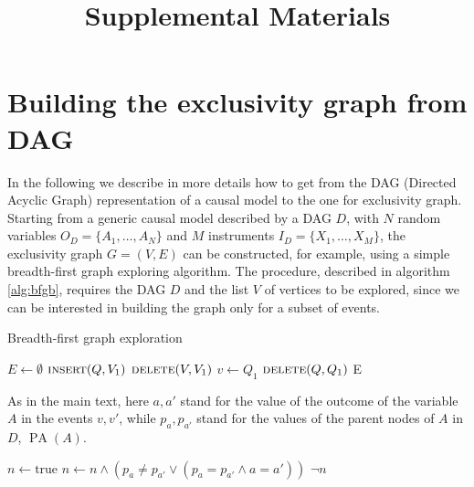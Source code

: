 \documentclass[letterpaper]{article}
\DeclareMathOperator*{\PA}{PA}
\begin{document}
\title{Supplemental Materials}
\maketitle
\section*{Building the exclusivity graph from DAG}
In the following we describe in more details how to get from the DAG
(Directed Acyclic Graph) representation of a causal model to the one
for exclusivity graph.
Starting from a generic causal model described by a DAG $D$, with
$N$ random variables $O_D = \{A_1,\ldots,A_N\}$ and $M$ instruments
$I_D = \{X_1,\ldots,X_M\}$, the exclusivity graph $G = (V, E)$ can be
constructed, for example, using a simple breadth-first graph exploring
algorithm.
The procedure, described in algorithm \ref{alg:bfgb}, requires the DAG $D$
and the list $V$ of vertices to be explored, since we can be interested
in building the graph only for a subset of events.

\begin{algorithm*}
\caption{Breadth-first graph exploration}
\label{alg:bfgb}
\begin{algorithmic}[1]
\State $E \gets \emptyset$
    \State $\Call{insert}{Q, V_1}$ 
    \State $\Call{delete}{V, V_1}$
        \State $v \gets Q_1$ 
        \State $\Call{delete}{Q, Q_1}$
                \State {}
                \State {}
                \State {} 
        \EndIf
        \EndFor
    \EndWhile
\EndWhile
\State \Return E
\EndFunction
\end{algorithmic}
\vspace{1em}
As in the main text, here $a, a'$ stand for the value of the outcome of the
variable $A$ in the events $v, v'$, while $p_a, p_{a'}$ stand for the values
of the parent nodes of $A$ in $D$, $\PA (A)$.

\begin{algorithmic}[1]
    \State $n \gets \text{true}$
        \State $n \gets n \land \left(p_a \neq p_{a'} \lor (p_a = p_{a'} \land a = a') \right)$
    \EndFor
    \State \Return $\neg n$
\EndFunction
\end{algorithmic}
\end{algorithm*}
\end{document}
